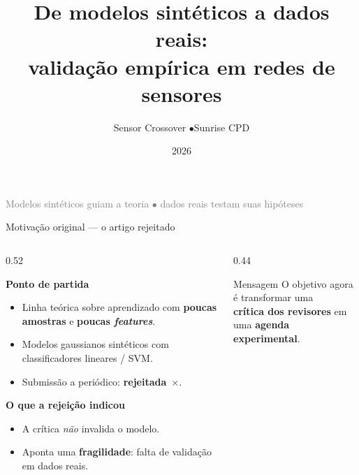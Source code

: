\documentclass[aspectratio=169, 11pt]{beamer}
\title[Modelos Sintéticos → Dados Reais]{%
  De modelos sintéticos a dados reais:\\[4pt]
  \large validação empírica em redes de sensores}
\author{Sensor Crossover \quad$\bullet$\quad Sunrise CPD}
\date{2026}
\institute{}
\begin{document}
\begin{frame}[plain]
\titlepage
\vspace{-1.5em}
\begin{center}
\small
\textcolor{gray}{%
  Modelos sintéticos guiam a teoria $\bullet$
  dados reais testam suas hipóteses}
\end{center}
\end{frame}

\begin{frame}{Motivação original --- o artigo rejeitado}

\begin{columns}[T]
\begin{column}{0.52\textwidth}

\textbf{Ponto de partida}
\begin{itemize}
  \item Linha teórica sobre aprendizado com \textbf{poucas amostras}
        e \textbf{poucas \textit{features}}.
  \item Modelos gaussianos sintéticos com classificadores lineares / SVM.
  \item Submissão a periódico: \textbf{rejeitada}~\textcolor{redbad}{$\times$}.
\end{itemize}

\vspace{0.4em}
\textbf{O que a rejeição indicou}
\begin{itemize}
  \item A crítica \emph{não} invalida o modelo.
  \item Aponta uma \textbf{fragilidade}: falta de validação em
        dados reais.
\end{itemize}

\end{column}
\begin{column}{0.44\textwidth}

\begin{block}{Mensagem}
\centering
O objetivo agora é transformar uma\\
\textbf{crítica dos revisores} em\\
uma \textbf{agenda experimental}.
\end{block}

\end{column}
\end{columns}

\end{frame}
\end{document}
